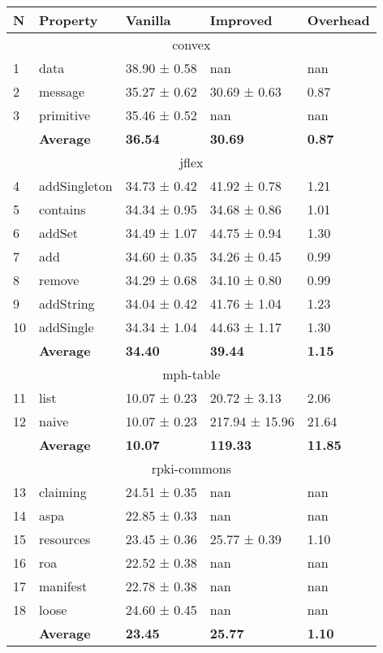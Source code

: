 \begin{tabular}{lllll}
N & Property & Vanilla & Improved & Overhead \\
\hline
\multicolumn{5}{c}{convex} \\
\hline
1 & data & 38.90 ± 0.58 & nan & nan \\
2 & message & 35.27 ± 0.62 & 30.69 ± 0.63 & 0.87 \\
3 & primitive & 35.46 ± 0.52 & nan & nan \\
\textbf{} & \textbf{Average} & \textbf{36.54} & \textbf{30.69} & \textbf{0.87} \\
\hline
\multicolumn{5}{c}{jflex} \\
\hline
4 & addSingleton & 34.73 ± 0.42 & 41.92 ± 0.78 & 1.21 \\
5 & contains & 34.34 ± 0.95 & 34.68 ± 0.86 & 1.01 \\
6 & addSet & 34.49 ± 1.07 & 44.75 ± 0.94 & 1.30 \\
7 & add & 34.60 ± 0.35 & 34.26 ± 0.45 & 0.99 \\
8 & remove & 34.29 ± 0.68 & 34.10 ± 0.80 & 0.99 \\
9 & addString & 34.04 ± 0.42 & 41.76 ± 1.04 & 1.23 \\
10 & addSingle & 34.34 ± 1.04 & 44.63 ± 1.17 & 1.30 \\
\textbf{} & \textbf{Average} & \textbf{34.40} & \textbf{39.44} & \textbf{1.15} \\
\hline
\multicolumn{5}{c}{mph-table} \\
\hline
11 & list & 10.07 ± 0.23 & 20.72 ± 3.13 & 2.06 \\
12 & naive & 10.07 ± 0.23 & 217.94 ± 15.96 & 21.64 \\
\textbf{} & \textbf{Average} & \textbf{10.07} & \textbf{119.33} & \textbf{11.85} \\
\hline
\multicolumn{5}{c}{rpki-commons} \\
\hline
13 & claiming & 24.51 ± 0.35 & nan & nan \\
14 & aspa & 22.85 ± 0.33 & nan & nan \\
15 & resources & 23.45 ± 0.36 & 25.77 ± 0.39 & 1.10 \\
16 & roa & 22.52 ± 0.38 & nan & nan \\
17 & manifest & 22.78 ± 0.38 & nan & nan \\
18 & loose & 24.60 ± 0.45 & nan & nan \\
\textbf{} & \textbf{Average} & \textbf{23.45} & \textbf{25.77} & \textbf{1.10} \\
\end{tabular}
